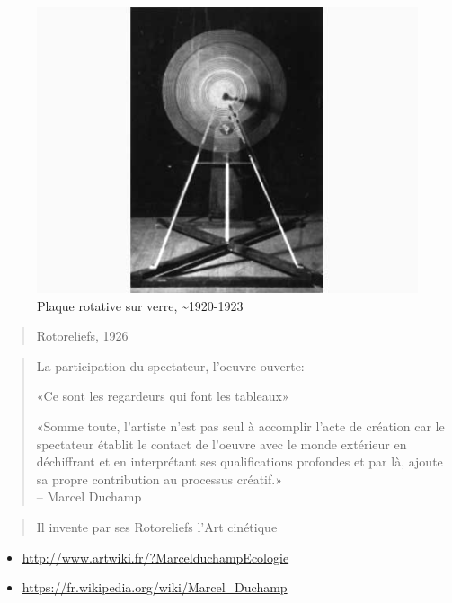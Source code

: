 \documentclass[
]{book}
\providecommand{\tightlist}{%
  \setlength{\itemsep}{0pt}\setlength{\parskip}{0pt}}
\begin{document}
\begin{figure}
\centering
\includegraphics{medias/corpus/duchamp/MarcelduchampEcologie_ducha_rotative_plaque_verre_20140917224650_20140917225046.jpg}
\caption{Plaque rotative sur verre, \textasciitilde1920-1923}
\end{figure}

\begin{quote}
Rotoreliefs, 1926
\end{quote}

\begin{quote}
La participation du spectateur, l'oeuvre ouverte:

«Ce sont les regardeurs qui font les tableaux»

«Somme toute, l'artiste n'est pas seul à accomplir l'acte de création car le spectateur établit le contact de l'oeuvre avec le monde extérieur en déchiffrant et en interprétant ses qualifications profondes et par là, ajoute sa propre contribution au processus créatif.»\\
-- Marcel Duchamp
\end{quote}

\begin{quote}
Il invente par ses Rotoreliefs l'Art cinétique
\end{quote}

\begin{itemize}
\tightlist
\item
  \url{http://www.artwiki.fr/?MarcelduchampEcologie}
\item
  \url{https://fr.wikipedia.org/wiki/Marcel_Duchamp}
\end{itemize}
\end{document}

